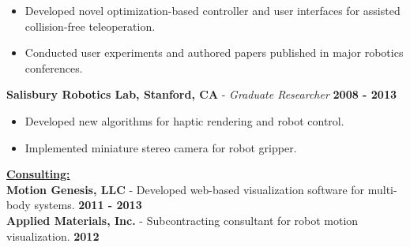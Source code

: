 \documentclass[line,margin]{res}
\newenvironment{compactlist}{
	\begin{itemize}\itemsep=0pt
}{
	\end{itemize}
}
\newcommand{\CVOnly}[1]{}
\newcommand{\CVOnly}[1]{#1}
\newcommand{\hide}[1]{}
\begin{document}
\begin{resume}
\begin{compactlist}
    \item Developed novel optimization-based controller and user interfaces for
      assisted collision-free teleoperation.
    \item Conducted user experiments and authored papers published in major
      robotics conferences.
  \end{compactlist}
{\bf Salisbury Robotics Lab, Stanford, CA} - \emph{Graduate Researcher}
  \hfill \textbf{2008 - 2013}
  \begin{compactlist}
    \item Developed new algorithms for haptic rendering and robot control.
    \item Implemented miniature stereo camera for robot gripper.
  \end{compactlist}
\CVOnly{
{\bf Electrical Engineering Intern} - Qual-Tron, Inc., Tulsa, OK
  \hfill \textbf{2006 - 2007}
  \begin{compactlist}
    \item Designed and implemented test procedures for IR and magnetic sensor products.
    \item Led redesign of a magnetic sensor product to reduce cost and simplify assembly.
  \end{compactlist}
}
%
\hide{
  \\[0.4pc]{\bf Summer Intern} - Atmel Corporation
    \hfill \textbf{Summer `05}
  \\[0.4pc]{\bf Summer Research Intern} - NASA Glenn Research Center
    \hfill \textbf{Summer `04}%
}
%
{\bf \underline{Consulting:}}
  {\\[0.2pc]{\bf Motion Genesis, LLC}
    - Developed web-based visualization software for multi-body systems.
      \hfill \textbf{2011 - 2013}}%
  {\\[0.0pc]{\bf Applied Materials, Inc.}
    - Subcontracting consultant for robot motion visualization.
      \hfill \textbf{2012}}%
  \CVOnly{\\[0.0pc]{\bf Charm Labs}
    - Dynamics and control. Confidential.
      \hfill \textbf{2012}}%
%
%

\end{resume}
\end{document}
